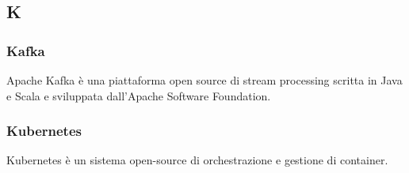 \subsection*{\textbf{\hfill \Huge{K} \hfill}} 
\subsubsection*{Kafka}
Apache Kafka è una piattaforma open source di stream processing scritta in Java e Scala e sviluppata dall'Apache Software Foundation.
\subsubsection*{Kubernetes}
Kubernetes  è un sistema open-source di orchestrazione e gestione di container.
